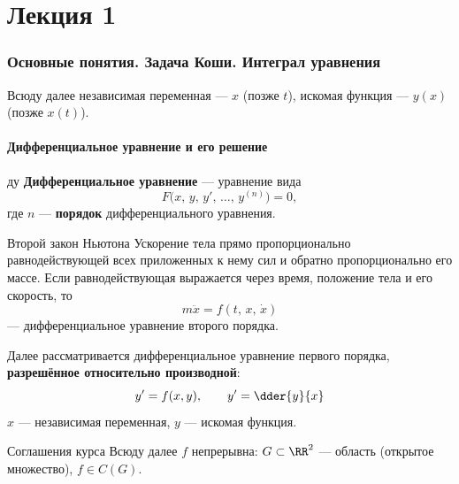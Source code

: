 %

\part*{Лекция 1}

\section{Основные понятия. Задача Коши. Интеграл уравнения}

Всюду далее независимая переменная --- $x$ (позже $t$), искомая функция ---
$y(x)$ (позже $x(t)$).

\subsection{Дифференциальное уравнение и его решение}\label{sec:основные-понятия}

\begin{Definition}{}{ду}
	\textbf{Дифференциальное уравнение} --- уравнение вида
	\[
	F\bigl(x,\,y,\,y',\,\dots,\,y^{(n)}\bigr) = 0,
	\]
	где $n$ --- \textbf{порядок} дифференциального уравнения.
\end{Definition}

\begin{Example}{Второй закон Ньютона}{}
	Ускорение тела прямо пропорционально равнодействующей всех приложенных
		к нему сил и обратно пропорционально его массе. Если равнодействующая
		выражается через время, положение тела и его скорость, то
	\[
	m\ddot{x} = f(t,\,x,\,\dot{x})
	\]
	--- дифференциальное уравнение второго порядка.
\end{Example}

Далее рассматривается дифференциальное уравнение первого порядка,
\textbf{разрешённое относительно производной}:
\[
y' = f(x,y), \qquad y' = \dder{y}{x}
\]
$x$ --- независимая переменная, $y$ --- искомая функция.

\begin{Remark}{Соглашения курса}{}
	Всюду далее $f$ непрерывна: $G \subset \RR^2$ --- область
	(открытое множество), $f \in C(G)$.
\end{Remark}

